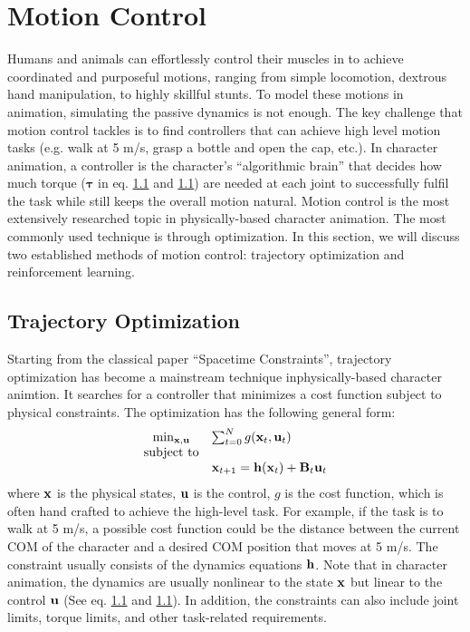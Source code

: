 \section{Motion Control}
Humans and animals can effortlessly control their muscles in to achieve coordinated and purposeful motions, ranging from simple locomotion, dextrous hand manipulation, to highly skillful stunts. To model these motions in animation, simulating the passive dynamics is not enough. The key challenge that motion control tackles is to find controllers that can achieve high level motion tasks (e.g. walk at 5 m/s, grasp a bottle and open the cap, etc.). In character animation, a controller is the character's ``algorithmic brain'' that decides how much torque ($\boldsymbol{\tau}$ in eq. \ref{} and \ref{}) are needed at each joint to successfully fulfil the task while still keeps the overall motion natural. Motion control is the most extensively researched topic in physically-based character animation. The most commonly used technique is through optimization. In this section, we will discuss two established methods of motion control: trajectory optimization and reinforcement learning.

\subsection{Trajectory Optimization}

Starting from the classical paper ``Spacetime Constraints'', trajectory optimization has become a mainstream technique inphysically-based character animtion. It searches for a controller that minimizes a cost function subject to physical constraints. The optimization has the following general form:
\begin{equation}
  \begin{array}{cl}
    \min_{\vc{x},\vc{u}}&\sum_{t=0}^{N}g(\vc{x}_t,\vc{u}_t)\\
    \textrm{subject to}&\\
    &\vc{x}_{t+1}=\vc{h}(\vc{x}_t)+\vc{B}_t\vc{u}_t
  \end{array}
  \label{eq:trajectoryOptimization}
\end{equation}
where $\mathbf{x}$ is the physical states, $\mathbf{u}$ is the control, $g$ is the cost function, which is often hand crafted to achieve the high-level task. For example, if the task is to walk at 5 m/s, a possible cost function could be the distance between the current COM of the character and a desired COM position that moves at 5 m/s. The constraint usually consists of the dynamics equations $\mathbf{h}$. Note that in character animation, the dynamics are usually nonlinear to the state $\mathbf{x}$ but linear to the control $\mathbf{u}$ (See eq. \ref{} and \ref{}). In addition, the constraints can also include joint limits, torque limits, and other task-related requirements.

